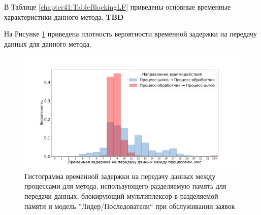 В Таблице \ref{chapter41:TableBlockingLF} приведены основные временные характеристики данного метода. \textbf{TBD}

На Рисунке \ref{chapter41:FigBlockingLF} приведена плотность вероятности временной задержки на передачу данных для данного метода.

\begin{figure}[!h]
\caption{Гистограмма временной задержки на передачу данных между процессами для метода, использующего разделяемую память для передачи данных, блокирующий мультиплексор в разделяемой памяти и модель ''Лидер/Последователи`` при обслуживании заявок}
\label{chapter41:FigBlockingLF}
\includegraphics[width=\textwidth]{../../graphics/hist/BlockingLF}
\end{figure}
%

